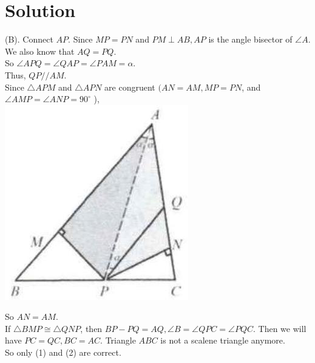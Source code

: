 \documentclass{article}
\begin{document}
\section*{Solution}
(B).
Connect \(A P\). Since \(M P=P N\) and \(P M \perp A B, A P\) is the angle bisector of \(\angle A\). We also know that \(A Q=P Q\).\\
So \(\angle A P Q=\angle Q A P=\angle P A M=\alpha\).\\
Thus, \(Q P / / A M\).\\
Since \(\triangle A P M\) and \(\triangle A P N\) are congruent \((A N=A M, M P=P N\), and \(\angle A M P=\angle A N P=90^{\circ}\) ),\\
\centering
\includegraphics[width=\textwidth]{images/067(1).jpg}


So \(A N=A M\).\\
If \(\triangle B M P \cong \triangle Q N P\), then \(B P-P Q=A Q, \angle B=\angle Q P C=\angle P Q C\). Then we will have \(P C=Q C, B C=A C\). Triangle \(A B C\) is not a scalene triangle anymore.\\
So only (1) and (2) are correct.
\end{document}
